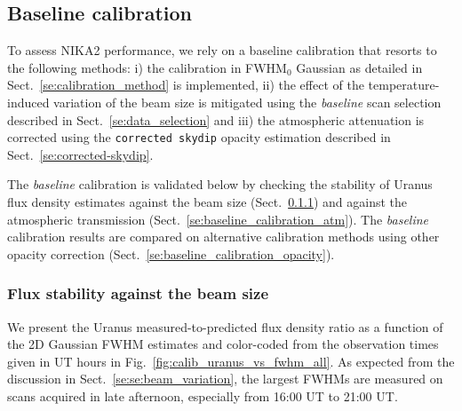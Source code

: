 

\subsection{Baseline calibration}
\label{se:baseline_calibration}

To assess NIKA2 performance, we rely on a baseline calibration that
resorts to the following methods: i) the calibration in FWHM$_0$ Gaussian
as detailed in Sect.~\ref{se:calibration_method} is implemented, ii)
the effect of the temperature-induced variation of the beam size is
mitigated using the \emph{baseline} scan selection described in
Sect.~\ref{se:data_selection} and iii) the
atmospheric attenuation is corrected using the {\tt corrected skydip}
opacity estimation described in Sect.~\ref{se:corrected-skydip}.

The \emph{baseline} calibration is validated below by checking the
stability of Uranus flux density estimates against the beam size
(Sect.~\ref{se:baseline_calibration_scans}) and against the
atmospheric transmission
(Sect.~\ref{se:baseline_calibration_atm}). The \emph{baseline}
calibration results are compared on alternative calibration methods
using other opacity correction (Sect.~\ref{se:baseline_calibration_opacity}).


\subsubsection{Flux stability against the beam size}
\label{se:baseline_calibration_scans}

We present the Uranus measured-to-predicted flux density ratio as a
function of the 2D Gaussian FWHM estimates and color-coded from the
observation times given in UT hours in
Fig.~\ref{fig:calib_uranus_vs_fwhm_all}. {\lp As expected from the
discussion in Sect.~\ref{se:se:beam_variation}, the largest FWHMs are
measured on scans acquired in late afternoon, especially from 16:00 UT
to 21:00 UT.}  


